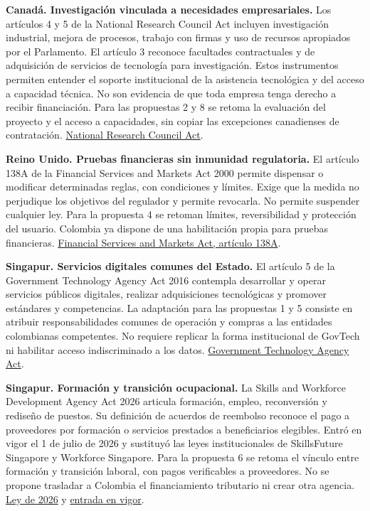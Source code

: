 \textbf{Canadá. Investigación vinculada a necesidades empresariales.} Los artículos 4 y 5 de la National Research Council Act incluyen investigación industrial, mejora de procesos, trabajo con firmas y uso de recursos apropiados por el Parlamento. El artículo 3 reconoce facultades contractuales y de adquisición de servicios de tecnología para investigación. Estos instrumentos permiten entender el soporte institucional de la asistencia tecnológica y del acceso a capacidad técnica. No son evidencia de que toda empresa tenga derecho a recibir financiación. Para las propuestas 2 y 8 se retoma la evaluación del proyecto y el acceso a capacidades, sin copiar las excepciones canadienses de contratación. \href{https://laws-lois.justice.gc.ca/eng/acts/N-15/FullText.html}{National Research Council Act}.

\textbf{Reino Unido. Pruebas financieras sin inmunidad regulatoria.} El artículo 138A de la Financial Services and Markets Act 2000 permite dispensar o modificar determinadas reglas, con condiciones y límites. Exige que la medida no perjudique los objetivos del regulador y permite revocarla. No permite suspender cualquier ley. Para la propuesta 4 se retoman límites, reversibilidad y protección del usuario. Colombia ya dispone de una habilitación propia para pruebas financieras. \href{https://www.legislation.gov.uk/ukpga/2000/8/section/138A}{Financial Services and Markets Act, artículo 138A}.

\textbf{Singapur. Servicios digitales comunes del Estado.} El artículo 5 de la Government Technology Agency Act 2016 contempla desarrollar y operar servicios públicos digitales, realizar adquisiciones tecnológicas y promover estándares y competencias. La adaptación para las propuestas 1 y 5 consiste en atribuir responsabilidades comunes de operación y compras a las entidades colombianas competentes. No requiere replicar la forma institucional de GovTech ni habilitar acceso indiscriminado a los datos. \href{https://sso.agc.gov.sg/Act-Rev/GTAA2016/Published?DocDate=20211231\&ProvIds=pr5-}{Government Technology Agency Act}.

\textbf{Singapur. Formación y transición ocupacional.} La Skills and Workforce Development Agency Act 2026 articula formación, empleo, reconversión y rediseño de puestos. Su definición de acuerdos de reembolso reconoce el pago a proveedores por formación o servicios prestados a beneficiarios elegibles. Entró en vigor el 1 de julio de 2026 y sustituyó las leyes institucionales de SkillsFuture Singapore y Workforce Singapore. Para la propuesta 6 se retoma el vínculo entre formación y transición laboral, con pagos verificables a proveedores. No se propone trasladar a Colombia el financiamiento tributario ni crear otra agencia. \href{https://sso.agc.gov.sg/Acts-Supp/17-2026/Published/20260605?DocDate=20260605\&ViewType=Within}{Ley de 2026} y \href{https://sso.agc.gov.sg/SL-Supp/S414-2026/Published/20260626?DocDate=20260626}{entrada en vigor}.

